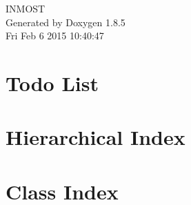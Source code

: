 \documentclass[twoside]{book}
\newcommand{\clearemptydoublepage}{%
  \newpage{\pagestyle{empty}\cleardoublepage}%
}
\begin{document}
\hypersetup{pageanchor=false}
\begin{titlepage}
\vspace*{7cm}
\begin{center}%
{\Large I\-N\-M\-O\-S\-T }\\
\vspace*{1cm}
{\large Generated by Doxygen 1.8.5}\\
\vspace*{0.5cm}
{\small Fri Feb 6 2015 10:40:47}\\
\end{center}
\end{titlepage}
\clearemptydoublepage
\tableofcontents
\clearemptydoublepage
{}
\hypersetup{pageanchor=true}

\chapter{Todo List}
\label{todo}
\hypertarget{todo}{}

\chapter{Hierarchical Index}

\chapter{Class Index}

\end{document}
